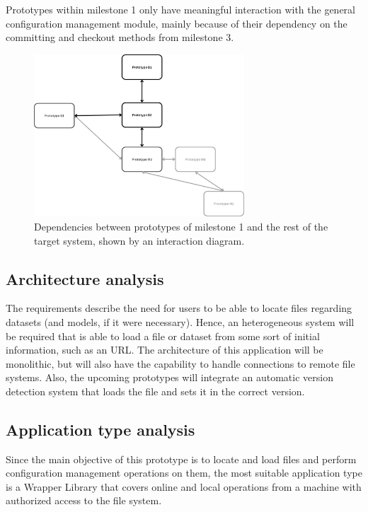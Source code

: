 Prototypes within milestone 1 only have meaningful interaction with the general configuration management module, mainly because of their dependency on the committing and
checkout methods from milestone 3. 

\begin{figure}[H]
    \centering
    \includegraphics[width=0.7\textwidth]{figs/D-dependencies.png}
    \caption{Dependencies between prototypes of milestone 1 and the rest of the target system, shown by an interaction diagram.}
\end{figure}

\subsection{Architecture analysis}

The requirements describe the need for users to be able to locate files regarding datasets (and models, if it were necessary). Hence, an heterogeneous system will be 
required that is able to load a file or dataset from some sort of initial information, such as an URL. The architecture of this application will be monolithic, but will 
also have the capability to handle connections to remote file systems. Also, the upcoming prototypes will integrate an automatic version detection system that loads the file and 
sets it in the correct version.

\subsection{Application type analysis}

Since the main objective of this prototype is to locate and load files and perform configuration management operations on them, the most suitable application type is a Wrapper Library 
that covers online and local operations from a machine with authorized access to the file system.

